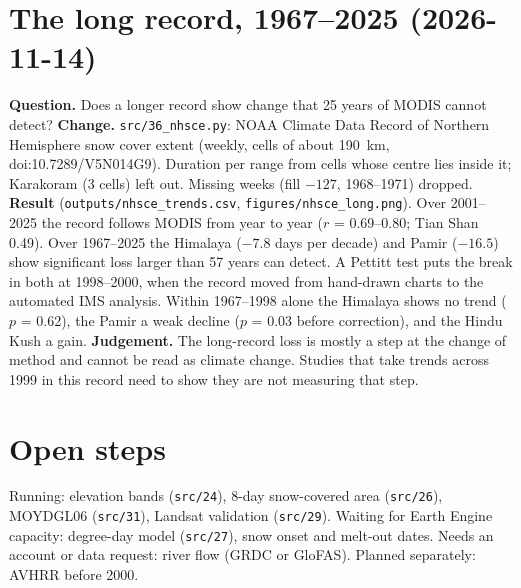 \documentclass[11pt,a4paper]{article}
\begin{document}
\section{The long record, 1967--2025 (2026-11-14)}
\textbf{Question.} Does a longer record show change that 25 years of MODIS cannot detect?
\textbf{Change.} \texttt{src/36\_nhsce.py}: NOAA Climate Data Record of Northern Hemisphere snow cover extent (weekly,
cells of about 190~km, doi:10.7289/V5N014G9). Duration per range from cells whose centre lies inside it; Karakoram
(3 cells) left out. Missing weeks (fill $-127$, 1968--1971) dropped.
\textbf{Result} (\texttt{outputs/nhsce\_trends.csv}, \texttt{figures/nhsce\_long.png}). Over 2001--2025 the record follows
MODIS from year to year ($r$ = 0.69--0.80; Tian Shan 0.49). Over 1967--2025 the Himalaya ($-7.8$ days per decade) and
Pamir ($-16.5$) show significant loss larger than 57 years can detect. A Pettitt test puts the break in both at
1998--2000, when the record moved from hand-drawn charts to the automated IMS analysis. Within 1967--1998 alone the
Himalaya shows no trend ($p$ = 0.62), the Pamir a weak decline ($p$ = 0.03 before correction), and the Hindu Kush a gain.
\textbf{Judgement.} The long-record loss is mostly a step at the change of method and cannot be read as climate change.
Studies that take trends across 1999 in this record need to show they are not measuring that step.

\section{Open steps}
Running: elevation bands (\texttt{src/24}), 8-day snow-covered area (\texttt{src/26}), MOYDGL06 (\texttt{src/31}), Landsat
validation (\texttt{src/29}). Waiting for Earth Engine capacity: degree-day model (\texttt{src/27}), snow onset and
melt-out dates. Needs an account or data request: river flow (GRDC or GloFAS). Planned separately: AVHRR before 2000.
\end{document}
